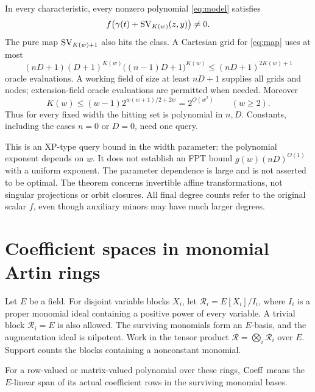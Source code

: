 \begin{theorem}\label{thm:main}
In every characteristic, every nonzero polynomial \eqref{eq:model}
satisfies
\begin{equation}\label{eq:map}
 f\bigl(\gamma(t)+\operatorname{SV}_{K(w)}(z,y)\bigr)\ne0.
\end{equation}
The pure map $\operatorname{SV}_{K(w)+1}$ also hits the class. A Cartesian grid
for \eqref{eq:map} uses at most
\begin{equation}\label{eq:grid}
 (nD+1)(D+1)^{K(w)}\bigl((n-1)D+1\bigr)^{K(w)}
 \le(nD+1)^{2K(w)+1}
\end{equation}
oracle evaluations. A working field of size at least $nD+1$ supplies
all grids and nodes; extension-field oracle evaluations are permitted
when needed. Moreover
\[
 K(w)\le(w-1)2^{w(w+1)/2+2w}=2^{O(w^2)}\qquad(w\ge2).
\]
Thus for every fixed width the hitting set is polynomial in $n,D$.
Constants, including the cases $n=0$ or $D=0$, need one query.
\end{theorem}

This is an XP-type query bound in the width parameter: the polynomial
exponent depends on $w$. It does not establish an FPT bound
$g(w)(nD)^{O(1)}$ with a uniform exponent. The parameter dependence is
large and is not asserted to be optimal.
The theorem concerns invertible affine transformations, not singular
projections or orbit closures. All final degree counts refer to the
original scalar $f$, even though auxiliary minors may have much larger
degrees.

\section{Coefficient spaces in monomial Artin rings}

Let $E$ be a field. For disjoint variable blocks $X_i$, let
$\mathcal R_i=E[X_i]/I_i$, where $I_i$ is a proper monomial ideal
containing a positive power of every variable. A trivial block
$\mathcal R_i=E$ is also allowed. The surviving monomials form an
$E$-basis, and the augmentation ideal is nilpotent. Work in the tensor
product $\mathcal R=\bigotimes_i\mathcal R_i$ over $E$.
Support counts the blocks containing a nonconstant monomial.

For a row-valued or matrix-valued polynomial over these rings,
$\operatorname{Coeff}$ means the $E$-linear span of its actual coefficient rows
in the surviving monomial bases.

